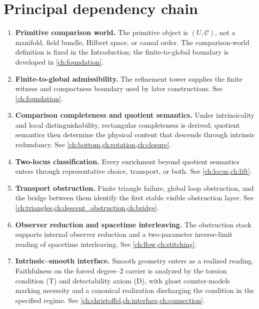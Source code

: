 \section*{Principal dependency chain}
\begin{enumerate}[label=\textup{(\arabic*)}]
\item \textbf{Primitive comparison world.}
The primitive object is \((U,\mathcal C)\), not a manifold, field bundle,
Hilbert space, or causal order.  The comparison-world definition is fixed
in the Introduction; the finite-to-global boundary is developed in
\cref{ch:foundation}.

\item \textbf{Finite-to-global admissibility.}
The refinement tower supplies the finite witness and compactness boundary
used by later constructions.  See \cref{ch:foundation}.

\item \textbf{Comparison completeness and quotient semantics.}
Under intrinsicality and local distinguishability, rectangular
completeness is derived; quotient semantics then determine the physical
content that descends through intrinsic redundancy.  See
\cref{ch:bottom,ch:rotation,ch:closure}.

\item \textbf{Two-locus classification.}
Every enrichment beyond quotient semantics enters through representative
choice, transport, or both.  See \cref{ch:locus,ch:lift}.

\item \textbf{Transport obstruction.}
Finite triangle failure, global loop obstruction, and the bridge between
them identify the first stable visible obstruction layer.  See
\cref{ch:triangles,ch:descent_obstruction,ch:bridge}.

\item \textbf{Observer reduction and spacetime interleaving.}
The obstruction stack supports internal observer reduction and a
two-parameter inverse-limit reading of spacetime interleaving.  See
\cref{ch:flow,ch:stitching}.

\item \textbf{Intrinsic--smooth interface.}
Smooth geometry enters as a realized reading.  Faithfulness on the forced
degree--\(2\) carrier is analyzed by the torsion condition \textup{(T)}
and detectability axiom \textup{(D)}, with ghost counter-models marking
necessity and a canonical realization discharging the condition in the
specified regime.  See \cref{ch:christoffel,ch:interface,ch:connection}.


\end{enumerate}
